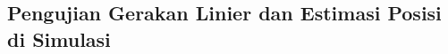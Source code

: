\subsection{Pengujian Gerakan Linier dan Estimasi Posisi di Simulasi}
\label{subsec:liniersimulasi}

\textcolor{red}{\lipsum[1-2]}
